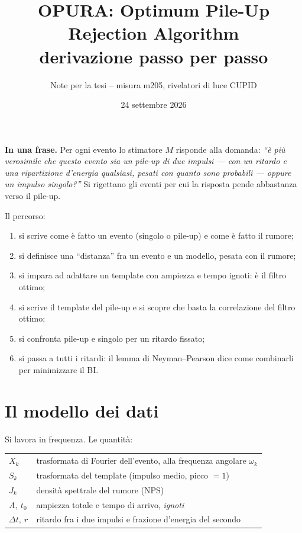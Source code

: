 \documentclass[11pt,a4paper]{article}
\title{OPURA: Optimum Pile-Up Rejection Algorithm\\[2pt]
\large derivazione passo per passo}
\author{Note per la tesi -- misura m205, rivelatori di luce CUPID}
\date{24 settembre 2026}
\newcommand{\dt}{\Delta t}
\begin{document}
\maketitle

\begin{idea}
\textbf{In una frase.} Per ogni evento lo stimatore $M$ risponde alla domanda:
\emph{``è più verosimile che questo evento sia un pile-up di due impulsi --- con un ritardo e una
ripartizione d'energia qualsiasi, pesati con quanto sono probabili --- oppure un impulso singolo?''}
Si rigettano gli eventi per cui la risposta pende abbastanza verso il pile-up.
\end{idea}

\noindent Il percorso:
\begin{enumerate}
  \item si scrive come è fatto un evento (singolo o pile-up) e come è fatto il rumore;
  \item si definisce una ``distanza'' fra un evento e un modello, pesata con il rumore;
  \item si impara ad adattare un template con ampiezza e tempo ignoti: è il filtro ottimo;
  \item si scrive il template del pile-up e si scopre che basta la correlazione del filtro ottimo;
  \item si confronta pile-up e singolo per un ritardo fissato;
  \item si passa a tutti i ritardi: il lemma di Neyman--Pearson dice come combinarli per minimizzare il BI.
\end{enumerate}

\section{Il modello dei dati}
Si lavora in frequenza. Le quantità:

\begin{center}
\begin{tabular}{ll}
\toprule
$X_k$ & trasformata di Fourier dell'evento, alla frequenza angolare $\omega_k$ \\
$S_k$ & trasformata del template (impulso medio, picco $=1$)\footnotemark \\
$J_k$ & densità spettrale del rumore (NPS) \\
$A,\ t_0$ & ampiezza totale e tempo di arrivo, \emph{ignoti} \\
$\dt,\ r$ & ritardo fra i due impulsi e frazione d'energia del secondo \\
\bottomrule
\end{tabular}
\end{center}
\end{document}
